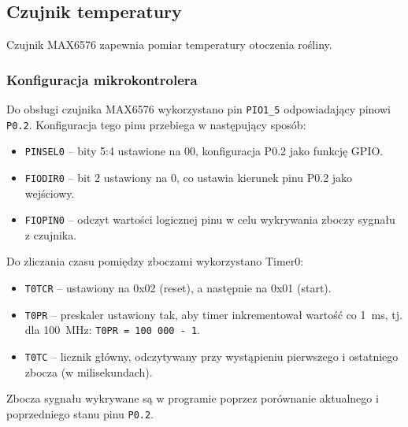 \subsection{Czujnik temperatury}
Czujnik MAX6576 zapewnia pomiar temperatury otoczenia rośliny.

\subsubsection{Konfiguracja mikrokontrolera}

Do obsługi czujnika MAX6576 wykorzystano pin \texttt{PIO1\_5} odpowiadający pinowi \texttt{P0.2}. Konfiguracja tego pinu przebiega w następujący sposób:

\begin{itemize}
    \item \texttt{PINSEL0} – bity 5:4 ustawione na 00, konfiguracja P0.2 jako funkcję GPIO.
    \item \texttt{FIODIR0} – bit 2 ustawiony na 0, co ustawia kierunek pinu P0.2 jako wejściowy.
    \item \texttt{FIOPIN0} – odczyt wartości logicznej pinu w celu wykrywania zboczy sygnału z czujnika.
\end{itemize}

Do zliczania czasu pomiędzy zboczami wykorzystano Timer0:

\begin{itemize}
    \item \texttt{T0TCR} – ustawiony na 0x02 (reset), a następnie na 0x01 (start).
    \item \texttt{T0PR} – preskaler ustawiony tak, aby timer inkrementował wartość co 1~ms, tj. dla 100~MHz: \texttt{T0PR = 100\,000 - 1}.
    \item \texttt{T0TC} – licznik główny, odczytywany przy wystąpieniu pierwszego i ostatniego zbocza (w milisekundach).
\end{itemize}

Zbocza sygnału wykrywane są w programie poprzez porównanie aktualnego i poprzedniego stanu pinu \texttt{P0.2}.

